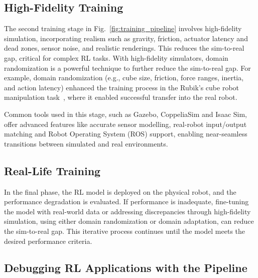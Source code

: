 \subsection{High-Fidelity Training}

The second training stage in Fig.\ \ref{fig:training_pipeline} involves high-fidelity simulation, incorporating realism such as gravity, friction, actuator latency and dead zones, sensor noise, and realistic renderings. This reduces the sim-to-real gap, critical for complex RL tasks. With high-fidelity simulators, domain randomization is a powerful technique to further reduce the sim-to-real gap. For example, domain randomization (e.g., cube size, friction, force ranges, inertia, and action latency) enhanced the training process in the Rubik's cube robot manipulation task~\cite{akkaya2019solving}, where it enabled successful transfer into the real robot.

Common tools used in this stage, such as Gazebo, CoppeliaSim and Isaac Sim, offer advanced features like accurate sensor modelling, real-robot input/output matching and Robot Operating System (ROS) support, enabling near-seamless transitions between simulated and real environments.

\subsection{Real-Life Training}

In the final phase, the RL model is deployed on the physical robot, and the performance degradation is evaluated. If performance is inadequate, fine-tuning the model with real-world data or addressing discrepancies through high-fidelity simulation, using either domain randomization or domain adaptation, can reduce the sim-to-real gap. This iterative process continues until the model meets the desired performance criteria.



\subsection{Debugging RL Applications with the Pipeline}

